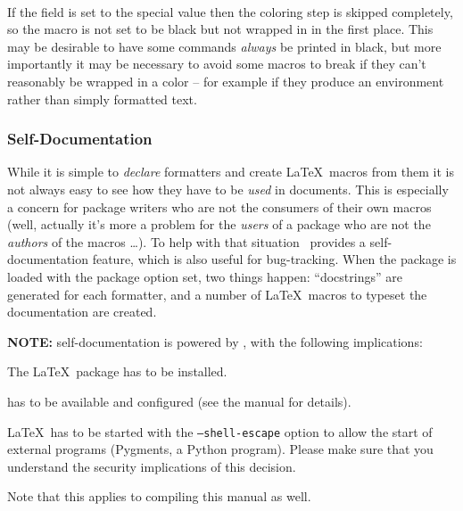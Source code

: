 \documentclass[12pt]{scrartcl}
\begin{document}
\paragraph{}

If the  field is set to the special value  then
the coloring step is skipped completely, so the macro is not set to be black but
not wrapped in  in the first place.  This may be desirable to
have some commands \emph{always} be printed in black, but more importantly it
may be necessary to avoid some macros to break if they can't reasonably be
wrapped in a color -- for example if they produce an environment rather than
simply formatted text.


\subsubsection{Self-Documentation}
\label{sec:self-documentation}

While it is simple to \emph{declare} formatters and create \LaTeX\ macros from
them it is not always easy to see how they have to be \emph{used} in documents.
This is especially a concern for package writers who are not the consumers of
their own macros (well, actually it's more a problem for the \emph{users} of a
package who are not the \emph{authors} of the macros \dots).  To help with that
situation \luaformatters\ provides a self-documentation feature, which is
also useful for bug-tracking. When the package is loaded with the
 package option set, two things happen: “docstrings”
are generated for each formatter, and a number of \LaTeX\ macros to typeset the
documentation are created.

\medskip

\noindent \textbf{NOTE:} self-documentation is powered by , with
the following implications:

\begin{itemize*}
\item The  \LaTeX\ package has to be installed.
\item {} has to be available and configured (see the  manual for details).
\item \LaTeX\ has to be started with the \texttt{--shell-escape} option to
allow the start of external programs (Pygments, a Python program).  Please make
sure that you understand the security implications of this decision.
\item Note that this applies to compiling this manual as well.
\end{itemize*}
\end{document}
